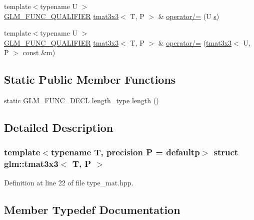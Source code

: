 \begin{DoxyCompactItemize}
\item 
{\footnotesize template$<$typename U $>$ }\\\mbox{\hyperlink{setup_8hpp_a33fdea6f91c5f834105f7415e2a64407}{G\+L\+M\+\_\+\+F\+U\+N\+C\+\_\+\+Q\+U\+A\+L\+I\+F\+I\+ER}} \mbox{\hyperlink{structglm_1_1tmat3x3}{tmat3x3}}$<$ T, P $>$ \& \mbox{\hyperlink{structglm_1_1tmat3x3_af0edea7ecc6cfc8344c91f9aeb0dcef4}{operator/=}} (U \mbox{\hyperlink{glad_8h_af1b1d5edfea6a34daee7389b1b5810ad}{s}})
\item 
{\footnotesize template$<$typename U $>$ }\\\mbox{\hyperlink{setup_8hpp_a33fdea6f91c5f834105f7415e2a64407}{G\+L\+M\+\_\+\+F\+U\+N\+C\+\_\+\+Q\+U\+A\+L\+I\+F\+I\+ER}} \mbox{\hyperlink{structglm_1_1tmat3x3}{tmat3x3}}$<$ T, P $>$ \& \mbox{\hyperlink{structglm_1_1tmat3x3_a0adc3f9a1be28dd0e4ea34c816b364fc}{operator/=}} (\mbox{\hyperlink{structglm_1_1tmat3x3}{tmat3x3}}$<$ U, P $>$ const \&m)
\end{DoxyCompactItemize}
\subsection*{Static Public Member Functions}
\begin{DoxyCompactItemize}
\item 
static \mbox{\hyperlink{setup_8hpp_ab2d052de21a70539923e9bcbf6e83a51}{G\+L\+M\+\_\+\+F\+U\+N\+C\+\_\+\+D\+E\+CL}} \mbox{\hyperlink{structglm_1_1tmat3x3_a78fa6e6e406213fa0049b5125b2686b5}{length\+\_\+type}} \mbox{\hyperlink{structglm_1_1tmat3x3_a4dd8598cc33aa07fe94fb019c8ac79cf}{length}} ()
\end{DoxyCompactItemize}


\subsection{Detailed Description}
\subsubsection*{template$<$typename T, precision P = defaultp$>$\newline
struct glm\+::tmat3x3$<$ T, P $>$}



Definition at line 22 of file type\+\_\+mat.\+hpp.



\subsection{Member Typedef Documentation}
\mbox{\label{structglm_1_1tmat3x3_a0b80bddb3cb4e01aa04d1c7a5a47365a}} 
